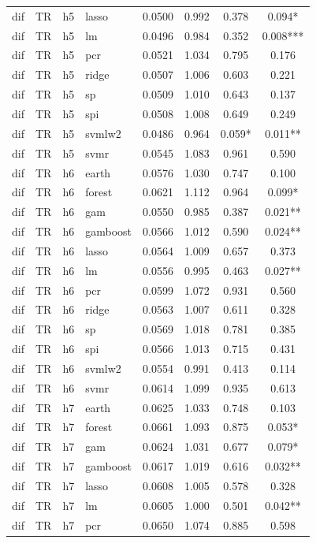 \begin{ThreePartTable}
\begin{longtable}[t]{llclcccc}
dif & TR & h5 & lasso & 0.0500 & 0.992 & 0.378 & 0.094*\\
dif & TR & h5 & lm & 0.0496 & 0.984 & 0.352 & 0.008***\\
dif & TR & h5 & pcr & 0.0521 & 1.034 & 0.795 & 0.176\\
dif & TR & h5 & ridge & 0.0507 & 1.006 & 0.603 & 0.221\\
dif & TR & h5 & sp & 0.0509 & 1.010 & 0.643 & 0.137\\
dif & TR & h5 & spi & 0.0508 & 1.008 & 0.649 & 0.249\\
dif & TR & h5 & svmlw2 & 0.0486 & 0.964 & 0.059* & 0.011**\\
dif & TR & h5 & svmr & 0.0545 & 1.083 & 0.961 & 0.590\\
\addlinespace
dif & TR & h6 & earth & 0.0576 & 1.030 & 0.747 & 0.100\\
dif & TR & h6 & forest & 0.0621 & 1.112 & 0.964 & 0.099*\\
dif & TR & h6 & gam & 0.0550 & 0.985 & 0.387 & 0.021**\\
dif & TR & h6 & gamboost & 0.0566 & 1.012 & 0.590 & 0.024**\\
dif & TR & h6 & lasso & 0.0564 & 1.009 & 0.657 & 0.373\\
dif & TR & h6 & lm & 0.0556 & 0.995 & 0.463 & 0.027**\\
dif & TR & h6 & pcr & 0.0599 & 1.072 & 0.931 & 0.560\\
dif & TR & h6 & ridge & 0.0563 & 1.007 & 0.611 & 0.328\\
dif & TR & h6 & sp & 0.0569 & 1.018 & 0.781 & 0.385\\
dif & TR & h6 & spi & 0.0566 & 1.013 & 0.715 & 0.431\\
dif & TR & h6 & svmlw2 & 0.0554 & 0.991 & 0.413 & 0.114\\
dif & TR & h6 & svmr & 0.0614 & 1.099 & 0.935 & 0.613\\
\addlinespace
dif & TR & h7 & earth & 0.0625 & 1.033 & 0.748 & 0.103\\
dif & TR & h7 & forest & 0.0661 & 1.093 & 0.875 & 0.053*\\
dif & TR & h7 & gam & 0.0624 & 1.031 & 0.677 & 0.079*\\
dif & TR & h7 & gamboost & 0.0617 & 1.019 & 0.616 & 0.032**\\
dif & TR & h7 & lasso & 0.0608 & 1.005 & 0.578 & 0.328\\
dif & TR & h7 & lm & 0.0605 & 1.000 & 0.501 & 0.042**\\
dif & TR & h7 & pcr & 0.0650 & 1.074 & 0.885 & 0.598\\

\end{longtable}
\end{ThreePartTable}
